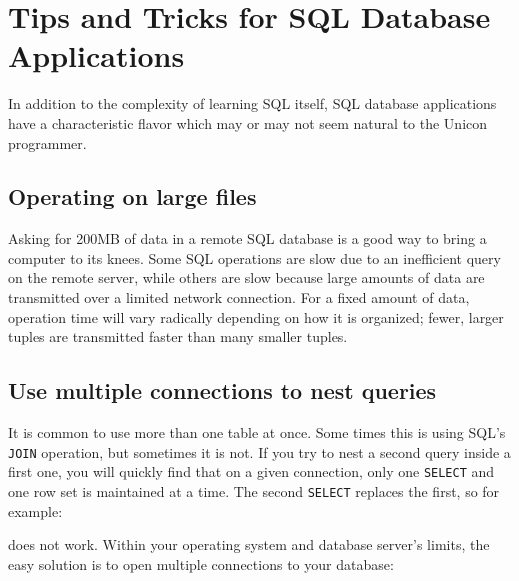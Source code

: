 \section{Tips and Tricks for SQL Database Applications}

In addition to the complexity of learning SQL itself, SQL database
applications have a characteristic flavor which may or may not seem
natural to the Unicon programmer.

\subsection*{Operating on large files}

Asking for 200MB of data in a remote SQL database is a good way to
bring a computer to its knees. Some SQL operations are slow due to an
inefficient query on the remote server, while others are slow because
large amounts of data are transmitted over a limited network
connection. For a fixed amount of data, operation time will vary
radically depending on how it is organized; fewer, larger tuples are
transmitted faster than many smaller tuples.

\subsection*{Use multiple connections to nest queries}

It is common to use more than one table at once. Some times this is
using SQL's \texttt{JOIN} operation, but sometimes it
is not. If you try to nest a second query inside a first one, you will
quickly find that on a given connection, only one \texttt{SELECT} and
one row set is maintained at a time. The second \texttt{SELECT}
replaces the first, so for example:


\noindent
does not work. Within your operating system and database
server's limits, the easy solution is to open multiple
connections to your database:


